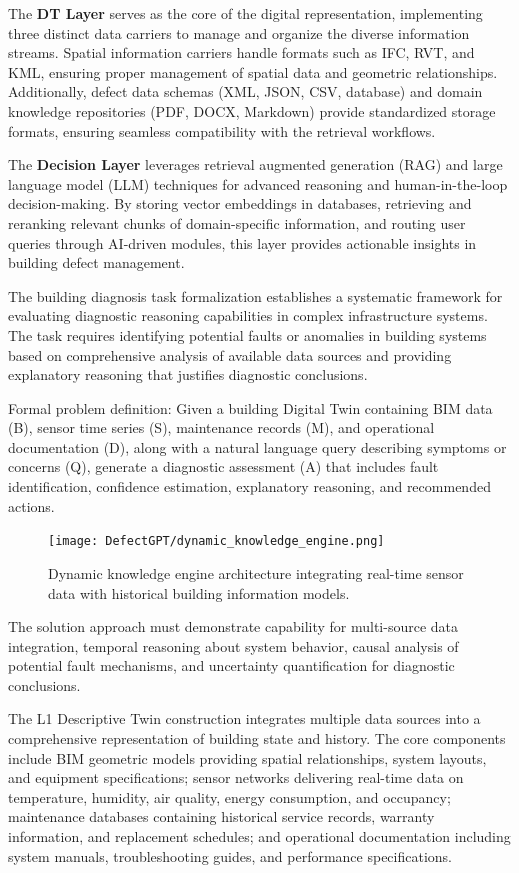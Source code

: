 The \textbf{DT Layer} serves as the core of the digital representation, implementing three distinct data carriers to manage and organize the diverse information streams. Spatial information carriers handle formats such as IFC, RVT, and KML, ensuring proper management of spatial data and geometric relationships. Additionally, defect data schemas (XML, JSON, CSV, database) and domain knowledge repositories (PDF, DOCX, Markdown) provide standardized storage formats, ensuring seamless compatibility with the retrieval workflows.

The \textbf{Decision Layer} leverages retrieval augmented generation (RAG) and large language model (LLM) techniques for advanced reasoning and human-in-the-loop decision-making. By storing vector embeddings in databases, retrieving and reranking relevant chunks of domain-specific information, and routing user queries through AI-driven modules, this layer provides actionable insights in building defect management.

The building diagnosis task formalization establishes a systematic framework for evaluating diagnostic reasoning capabilities in complex infrastructure systems. The task requires identifying potential faults or anomalies in building systems based on comprehensive analysis of available data sources and providing explanatory reasoning that justifies diagnostic conclusions.

Formal problem definition: Given a building Digital Twin containing BIM data (B), sensor time series (S), maintenance records (M), and operational documentation (D), along with a natural language query describing symptoms or concerns (Q), generate a diagnostic assessment (A) that includes fault identification, confidence estimation, explanatory reasoning, and recommended actions.

\begin{figure}[htbp]
\centering
\texttt{[image: DefectGPT/dynamic\_knowledge\_engine.png]}
\caption{Dynamic knowledge engine architecture integrating real-time sensor data with historical building information models.}
\label{fig:dynamic_knowledge_engine}
\end{figure}

The solution approach must demonstrate capability for multi-source data integration, temporal reasoning about system behavior, causal analysis of potential fault mechanisms, and uncertainty quantification for diagnostic conclusions.



The L1 Descriptive Twin construction integrates multiple data sources into a comprehensive representation of building state and history. The core components include BIM geometric models providing spatial relationships, system layouts, and equipment specifications; sensor networks delivering real-time data on temperature, humidity, air quality, energy consumption, and occupancy; maintenance databases containing historical service records, warranty information, and replacement schedules; and operational documentation including system manuals, troubleshooting guides, and performance specifications.

